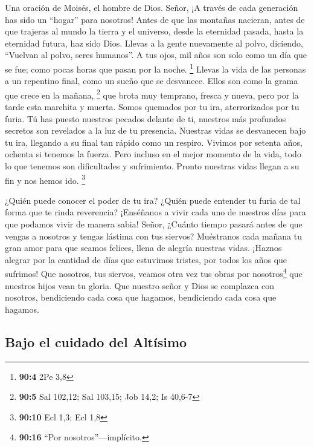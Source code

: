 Una oración de Moisés, el hombre de Dios.  Señor, ¡A
través de cada generación has sido un ``hogar'' para nosotros!
 Antes de que las montañas nacieran, antes de que trajeras
al mundo la tierra y el universo, desde la eternidad pasada, hasta la
eternidad futura, haz sido Dios.  Llevas a la gente
nuevamente al polvo, diciendo, ``Vuelvan al polvo, seres humanos''.
 A tus ojos, mil años son solo como un día que se fue;
como pocas horas que pasan por la noche. \footnote{\textbf{90:4} 2Pe 3,8}
 Llevas la vida de las personas a un repentino final, como
un sueño que se desvanece. Ellos son como la grama que crece en la
mañana, \footnote{\textbf{90:5} Sal 102,12; Sal 103,15; Job 14,2; Is
  40,6-7}  que brota muy temprano, fresca y nueva, pero
por la tarde esta marchita y muerta.  Somos quemados por
tu ira, aterrorizados por tu furia.  Tú has puesto
nuestros pecados delante de ti, nuestros más profundos secretos son
revelados a la luz de tu presencia.  Nuestras vidas se
desvanecen bajo tu ira, llegando a su final tan rápido como un respiro.
 Vivimos por setenta años, ochenta si tenemos la fuerza.
Pero incluso en el mejor momento de la vida, todo lo que tenemos son
dificultades y sufrimiento. Pronto nuestras vidas llegan a su fin y nos
hemos ido. \footnote{\textbf{90:10} Ecl 1,3; Ecl 1,8}

 ¿Quién puede conocer el poder de tu ira? ¿Quién puede
entender tu furia de tal forma que te rinda reverencia? 
¡Enséñanos a vivir cada uno de nuestros días para que podamos vivir de
manera sabia!  Señor, ¿Cuánto tiempo pasará antes de que
vengas a nosotros y tengas lástima con tus siervos? 
Muéstranos cada mañana tu gran amor para que seamos felices, llena de
alegría nuestras vidas.  ¡Haznos alegrar por la cantidad
de días que estuvimos tristes, por todos los años que sufrimos!
 Que nosotros, tus siervos, veamos otra vez tus obras por
nosotros\footnote{\textbf{90:16} ``Por nosotros''---implícito.} que
nuestros hijos vean tu gloria.  Que nuestro señor y Dios
se complazca con nosotros, bendiciendo cada cosa que hagamos,
bendiciendo cada cosa que hagamos.

\hypertarget{bajo-el-cuidado-del-altuxedsimo}{%
\subsection{Bajo el cuidado del
Altísimo}\label{bajo-el-cuidado-del-altuxedsimo}}

